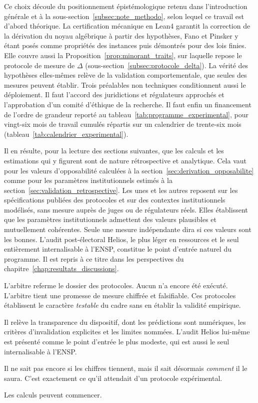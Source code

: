 \begin{sloppypar}
Ce choix d\'ecoule du positionnement \'epist\'emologique retenu dans l'introduction g\'en\'erale et \`a la
sous-section~\ref{subsec:note_methodo}, selon lequel ce travail est d'abord th\'eorique. La
certification m\'ecanique en Lean4 garantit la correction de la d\'erivation du noyau
alg\'ebrique \`a partir des hypoth\`eses, Fano et Pinsker y \'etant pos\'es comme
propri\'et\'es des instances puis d\'emontr\'es pour des lois finies. Elle couvre aussi la
Proposition~\ref{prop:minorant_traits}, sur laquelle repose le protocole de mesure de $\Delta$
(sous-section~\ref{subsec:protocole_delta}). La v\'erit\'e des hypoth\`eses elles-m\^emes rel\`eve de la
validation comportementale, que seules des mesures peuvent \'etablir. Trois pr\'ealables
non techniques conditionnent aussi le d\'eploiement. Il faut l'accord des
juridictions et r\'egulateurs approch\'es et l'approbation d'un comit\'e
d'\'ethique de la recherche. Il faut enfin un financement de l'ordre de grandeur
report\'e au tableau~\ref{tab:programme_experimental}, pour vingt-six mois de
travail cumul\'es r\'epartis sur un calendrier de trente-six mois
(tableau~\ref{tab:calendrier_experimental}).

Il en r\'esulte, pour la lecture des sections suivantes, que les
calculs et les estimations qui y figurent sont de
nature r\'etrospective et analytique. Cela vaut pour les valeurs
d'opposabilit\'e calcul\'ees \`a la
section~\ref{sec:derivation_opposabilite} comme pour les param\`etres
institutionnels estim\'es \`a la
section~\ref{sec:validation_retrospective}. Les unes et les autres
reposent sur les sp\'ecifications publi\'ees des protocoles et sur des
contextes institutionnels mod\'elis\'es, sans mesure aupr\`es de juges ou
de r\'egulateurs r\'eels. Elles \'etablissent que les param\`etres
institutionnels admettent des valeurs plausibles et mutuellement
coh\'erentes. Seule une mesure ind\'ependante dira si ces valeurs sont les
bonnes. L'audit
post-\'electoral Helios, le plus l\'eger en ressources et le seul
enti\`erement internalisable \`a l'ENSP, constitue le point d'entr\'ee
naturel du programme. Il est repris \`a ce titre dans les perspectives
du chapitre~\ref{chap:resultats_discussions}.

\end{sloppypar}

\begin{boiteArbitre}
L'arbitre referme le dossier des protocoles. Aucun n'a encore \'et\'e ex\'ecut\'e.
L'arbitre tient une promesse de mesure chiffr\'ee et falsifiable. Ces protocoles
\'etablissent le caract\`ere \emph{testable} du cadre sans en \'etablir la validit\'e
empirique.

Il rel\`eve la transparence du dispositif, dont les pr\'edictions
sont num\'eriques, les crit\`eres d'invalidation explicites et les
limites nomm\'ees. L'audit Helios lui-m\^eme est pr\'esent\'e comme le
point d'entr\'ee le plus modeste, qui est aussi le seul internalisable \`a l'ENSP.

Il ne sait pas encore si les chiffres tiennent, mais il sait d\'esormais
\emph{comment} il le saura. C'est exactement ce qu'il attendait d'un
protocole exp\'erimental.

Les calculs peuvent commencer.
\end{boiteArbitre}